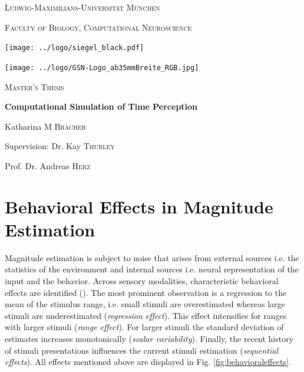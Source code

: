 \documentclass[10pt]{article}
\begin{document}
\begin{titlepage}
	\centering
	{\scshape\LARGE Ludwig-Maximilians-Universität München \par}
	{\scshape\large Faculty of Biology, Computational Neuroscience \par}
	\vspace{0.5cm}
	\texttt{[image: ../logo/siegel\_black.pdf]}\par
	\texttt{[image: ../logo/GSN-Logo\_ab35mmBreite\_RGB.jpg]}\par
	\vspace{0.7cm}
	{\scshape\LARGE Master's Thesis \par}
	\vspace{0.05cm}
	\vspace{0.05cm}
	{\huge\bfseries Computational Simulation of Time Perception \par}
	\vspace{1.4cm}
	{\Large Katharina \textsc{M Bracher} \par}
	\vspace{0.5cm}
	{\large Supervision: Dr. Kay \textsc{Thurley} \par}
	{\large Prof. Dr. Andreas \textsc{Herz} \par}
\end{titlepage}


\normalsize
\tableofcontents
\pagebreak


\section{Behavioral Effects in Magnitude Estimation}
Magnitude estimation is subject to noise that arises from external sources i.e. the statistics of the environment and internal sources i.e. neural representation of the input and the behavior.
Across sensory modalities, characteristic behavioral effects are identified (\cite{Petzschner2015}).
The most prominent observation is a regression to the mean of the stimulus range,  i.e. small stimuli are overestimated whereas large stimuli are underestimated (\textit{regression effect}). 
This effect intensifies for ranges with larger stimuli (\textit{range effect}).
For larger stimuli the standard deviation of estimates increases monotonically (\textit{scalar variability}). 
Finally, the recent history of stimuli presentations influences the current stimuli estimation (\textit{sequential effects}).
All effects mentioned above are displayed in Fig. \ref{fig:behavioraleffects}. 
\end{document}
